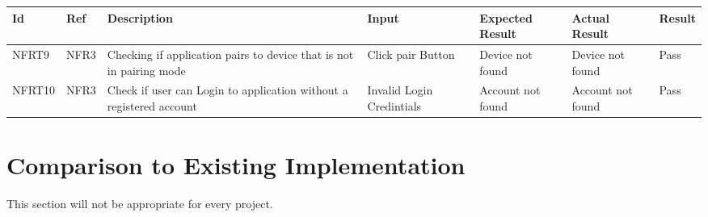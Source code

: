 \documentclass[12pt, titlepage]{article}
\begin{document}
\begin{longtable}{|p{1.4cm}|p{1cm}|p{3cm}|p{1.5cm}|p{2.5cm}|p{2cm}|p{1.2cm}|}
  \hline
  \textbf{Id} & \textbf{Ref} & \textbf{Description}                                                         & \textbf{Input}                                    & \textbf{Expected Result}    & \textbf{Actual Result}                          & \textbf{Result}                                     \\ \hline
  NFRT9        & NFR3          & Checking if application pairs to device that is not in pairing mode              & Click pair Button & Device not found & Device not found & {\color[HTML]{32CB00} Pass}                         \\ \hline
  NFRT10        & NFR3          & Check if user can Login to application without a registered account           & Invalid Login Credintials   &  Account not found      & Account not found    & {\color[HTML]{32CB00} Pass}                         \\ \hline
\end{longtable}
	
\section{Comparison to Existing Implementation}	

This section will not be appropriate for every project.
\end{document}
